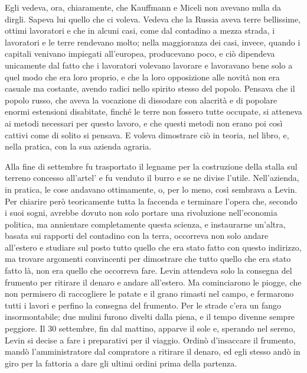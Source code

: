 Egli vedeva, ora, chiaramente, che Kauffmann e Miceli non avevano nulla da dirgli. Sapeva lui quello che ci voleva. Vedeva che la Russia aveva terre bellissime, ottimi lavoratori e che in alcuni casi, come dal contadino a mezza strada, i lavoratori e le terre rendevano molto; nella maggioranza dei casi, invece, quando i capitali venivano impiegati all'europea, producevano poco, e ciò dipendeva unicamente dal fatto che i lavoratori volevano lavorare e lavoravano bene solo a quel modo che era loro proprio, e che la loro opposizione alle novità non era casuale ma costante, avendo radici nello spirito stesso del popolo. Pensava che il popolo russo, che aveva la vocazione di dissodare con alacrità e di popolare enormi estensioni disabitate, finché le terre non fossero tutte occupate, si atteneva ai metodi necessari per questo lavoro, e che questi metodi non erano poi così cattivi come di solito si pensava. E voleva dimostrare ciò in teoria, nel libro, e, nella pratica, con la sua azienda agraria. 

Alla fine di settembre fu trasportato il legname per la costruzione della stalla sul terreno concesso all'artel' e fu venduto il burro e se ne divise l'utile. Nell'azienda, in pratica, le cose andavano ottimamente, o, per lo meno, così sembrava a Levin. Per chiarire però teoricamente tutta la faccenda e terminare l'opera che, secondo i suoi sogni, avrebbe dovuto non solo portare una rivoluzione nell'economia politica, ma annientare completamente questa scienza, e instaurarne un'altra, basata sui rapporti del contadino con la terra, occorreva non solo andare all'estero e studiare sul posto tutto quello che era stato fatto con questo indirizzo, ma trovare argomenti convincenti per dimostrare che tutto quello che era stato fatto là, non era quello che occorreva fare. Levin attendeva solo la consegna del frumento per ritirare il denaro e andare all'estero. Ma cominciarono le piogge, che non permisero di raccogliere le patate e il grano rimasti nel campo, e fermarono tutti i lavori e perfino la consegna del frumento. Per le strade c'era un fango insormontabile; due mulini furono divelti dalla piena, e il tempo divenne sempre peggiore. Il 30 settembre, fin dal mattino, apparve il sole e, sperando nel sereno, Levin si decise a fare i preparativi per il viaggio. Ordinò d'insaccare il frumento, mandò l'amministratore dal compratore a ritirare il denaro, ed egli stesso andò in giro per la fattoria a dare gli ultimi ordini prima della partenza. 

